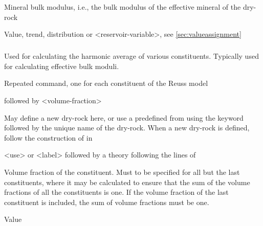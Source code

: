 {
 \slist
   \item \Description Mineral bulk modulus, i.e., the bulk modulus of the effective mineral of the dry-rock
   \item \Argument Value, trend, distribution or <reservoir-variable>, see \autoref{sec:valueassignment}
   \item \Default 
 \elist

\subparagraph{}
 \slist
   \item \Description Used for calculating the harmonic average of various constituents. Typically used for calculating effective bulk moduli. 
   \item \Argument
   \item \Default 
 \elist

 \slist
   \item \Description Repeated command, one for each constituent of the Reuss model
   \item {} followed by <volume-fraction>
   \item \Default
 \elist

 \slist
   \item \Description May define a new dry-rock here, or use a predefined  from  using the keyword  followed by the unique name of the dry-rock. When a new dry-rock is defined, follow the construction of  in 
   \item \Argument <use> or <label> followed by a theory following the lines of 
   \item \Default
 \elist

 \slist
   \item \Description Volume fraction of the constituent. Must to be specified for all but the last constituents, where it may be calculated to ensure that the sum of the volume fractions of all the constituents is one. If the volume fraction of the last constituent is included, the sum of volume fractions must be one. 
   \item \Argument Value
   \item \Default
 \elist

}

